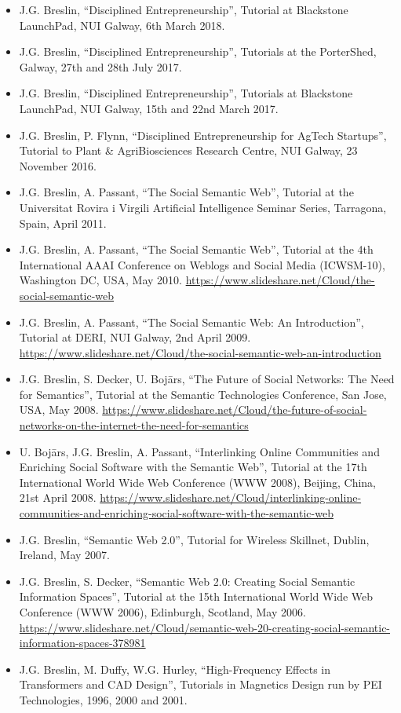 \documentclass[10pt,a4paper]{res} %
\begin{document}
\begin{resume}
\begin{itemize} \itemsep -2pt
\item J.G. Breslin, ``Disciplined Entrepreneurship'', Tutorial at Blackstone LaunchPad, NUI Galway, 6th March 2018. %
\item J.G. Breslin, ``Disciplined Entrepreneurship'', Tutorials at the PorterShed, Galway, 27th and 28th July 2017. %
\item J.G. Breslin, ``Disciplined Entrepreneurship'', Tutorials at Blackstone LaunchPad, NUI Galway, 15th and 22nd March 2017. %
\item J.G. Breslin, P. Flynn, ``Disciplined Entrepreneurship for AgTech Startups'', Tutorial to Plant \& AgriBiosciences Research Centre, NUI Galway, 23 November 2016. %
\item J.G. Breslin, A. Passant, ``The Social Semantic Web'', Tutorial at the Universitat Rovira i Virgili Artificial Intelligence Seminar Series, Tarragona, Spain, April 2011. %
\item J.G. Breslin, A. Passant, ``The Social Semantic Web'', Tutorial at the 4th International AAAI Conference on Weblogs and Social Media (ICWSM-10), Washington DC, USA, May 2010. \url{https://www.slideshare.net/Cloud/the-social-semantic-web}
\item J.G. Breslin, A. Passant, ``The Social Semantic Web: An Introduction'', Tutorial at DERI, NUI Galway, 2nd April 2009. \url{https://www.slideshare.net/Cloud/the-social-semantic-web-an-introduction}
\item J.G. Breslin, S. Decker, U. Boj\={a}rs, ``The Future of Social Networks: The Need for Semantics'', Tutorial at the Semantic Technologies Conference, San Jose, USA, May 2008. \url{https://www.slideshare.net/Cloud/the-future-of-social-networks-on-the-internet-the-need-for-semantics}
\item U. Boj\={a}rs, J.G. Breslin, A. Passant, ``Interlinking Online Communities and Enriching Social Software with the Semantic Web'', Tutorial at the 17th International World Wide Web Conference (WWW 2008), Beijing, China, 21st April 2008. \url{https://www.slideshare.net/Cloud/interlinking-online-communities-and-enriching-social-software-with-the-semantic-web}
\item J.G. Breslin, ``Semantic Web 2.0'', Tutorial for Wireless Skillnet, Dublin, Ireland, May 2007. %
\item J.G. Breslin, S. Decker, ``Semantic Web 2.0: Creating Social Semantic Information Spaces'', Tutorial at the 15th International World Wide Web Conference (WWW 2006), Edinburgh, Scotland, May 2006. \url{https://www.slideshare.net/Cloud/semantic-web-20-creating-social-semantic-information-spaces-378981}
\item J.G. Breslin, M. Duffy, W.G. Hurley, ``High-Frequency Effects in Transformers and CAD Design'', Tutorials in Magnetics Design run by PEI Technologies, 1996, 2000 and 2001. %
\end{itemize}


\end{resume}
\end{document}
